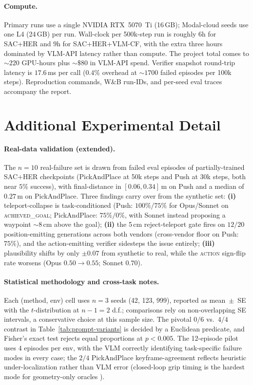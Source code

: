 \paragraph{Compute.}
Primary runs use a single NVIDIA RTX~5070~Ti (16\,GB); Modal-cloud
seeds use one L4 (24\,GB) per run. Wall-clock per 500k-step run is
roughly $6$h for SAC+HER and $9$h for SAC+HER+VLM-CF, with the extra
three hours dominated by VLM-API latency rather than compute. The
project total comes to ${\sim}220$ GPU-hours plus ${\sim}\$80$ in
VLM-API spend. Verifier snapshot round-trip latency is $17.6$\,ms per
call ($0.4\%$ overhead at ${\sim}1700$ failed episodes per 100k
steps). Reproduction commands, W\&B run-IDs, and per-seed eval traces
accompany the report.

\section{Additional Experimental Detail}
\label{app:results}

\paragraph{Real-data validation (extended).}
The $n\!=\!10$ real-failure set is drawn from failed eval episodes of
partially-trained SAC+HER checkpoints (PickAndPlace at 50k steps and
Push at 30k steps, both near $5\%$ success), with final-distance in
$[0.06,0.34]$\,m on Push and a median of $0.27$\,m on PickAndPlace.
Three findings carry over from the synthetic set: \textbf{(i)}
teleport-collapse is task-conditioned (Push: $100\%/75\%$ for
Opus/Sonnet on \textsc{achieved\_goal}; PickAndPlace: $75\%/0\%$,
with Sonnet instead proposing a waypoint ${\sim}8$\,cm above the
goal); \textbf{(ii)} the 5\,cm reject-teleport gate fires on $12/20$
position-emitting generations across both vendors (cross-vendor
floor on Push: $75\%$), and the action-emitting verifier sidesteps
the issue entirely; \textbf{(iii)} plausibility shifts by only
$\pm 0.07$ from synthetic to real, while the \textsc{action}
sign-flip rate worsens (Opus $0.50\!\to\!0.55$; Sonnet $0.70$).

\paragraph{Statistical methodology and cross-task notes.}
Each (method, env) cell uses $n\!=\!3$ seeds (42, 123, 999), reported
as mean~$\pm$~SE with the $t$-distribution at $n\!-\!1\!=\!2$ d.f.;
comparisons rely on non-overlapping SE intervals, a conservative
choice at this sample size. The pivotal $0/6$ vs.\ $4/4$ contrast in
Table~\ref{tab:prompt-variants} is decided by a Euclidean predicate,
and Fisher's exact test rejects equal proportions at $p\!<\!0.005$.
The 12-episode pilot uses $4$ episodes per env, with the VLM
correctly identifying task-specific failure modes in every case; the
$2/4$ PickAndPlace keyframe-agreement reflects heuristic
under-localization rather than VLM error (closed-loop grip timing is
the hardest mode for geometry-only oracles
\citep{sayar2023cebp}).

